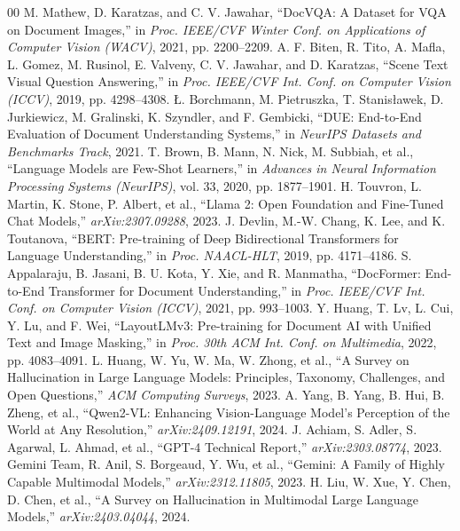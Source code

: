 \documentclass[conference]{IEEEtran}
\begin{document}
{%
\begin{thebibliography}{00}
 M. Mathew, D. Karatzas, and C. V. Jawahar, ``DocVQA: A Dataset for VQA on Document Images,'' in \emph{Proc. IEEE/CVF Winter Conf. on Applications of Computer Vision (WACV)}, 2021, pp. 2200--2209.
 A. F. Biten, R. Tito, A. Mafla, L. Gomez, M. Rusinol, E. Valveny, C. V. Jawahar, and D. Karatzas, ``Scene Text Visual Question Answering,'' in \emph{Proc. IEEE/CVF Int. Conf. on Computer Vision (ICCV)}, 2019, pp. 4298--4308.
 {\L}. Borchmann, M. Pietruszka, T. Stanis{\l}awek, D. Jurkiewicz, M. Gralinski, K. Szyndler, and F. Gembicki, ``DUE: End-to-End Evaluation of Document Understanding Systems,'' in \emph{NeurIPS Datasets and Benchmarks Track}, 2021.
 T. Brown, B. Mann, N. Nick, M. Subbiah, et al., ``Language Models are Few-Shot Learners,'' in \emph{Advances in Neural Information Processing Systems (NeurIPS)}, vol. 33, 2020, pp. 1877--1901.
 H. Touvron, L. Martin, K. Stone, P. Albert, et al., ``Llama 2: Open Foundation and Fine-Tuned Chat Models,'' \emph{arXiv:2307.09288}, 2023.
 J. Devlin, M.-W. Chang, K. Lee, and K. Toutanova, ``BERT: Pre-training of Deep Bidirectional Transformers for Language Understanding,'' in \emph{Proc. NAACL-HLT}, 2019, pp. 4171--4186.
 S. Appalaraju, B. Jasani, B. U. Kota, Y. Xie, and R. Manmatha, ``DocFormer: End-to-End Transformer for Document Understanding,'' in \emph{Proc. IEEE/CVF Int. Conf. on Computer Vision (ICCV)}, 2021, pp. 993--1003.
 Y. Huang, T. Lv, L. Cui, Y. Lu, and F. Wei, ``LayoutLMv3: Pre-training for Document AI with Unified Text and Image Masking,'' in \emph{Proc. 30th ACM Int. Conf. on Multimedia}, 2022, pp. 4083--4091.
 L. Huang, W. Yu, W. Ma, W. Zhong, et al., ``A Survey on Hallucination in Large Language Models: Principles, Taxonomy, Challenges, and Open Questions,'' \emph{ACM Computing Surveys}, 2023.
 A. Yang, B. Yang, B. Hui, B. Zheng, et al., ``Qwen2-VL: Enhancing Vision-Language Model's Perception of the World at Any Resolution,'' \emph{arXiv:2409.12191}, 2024.
 J. Achiam, S. Adler, S. Agarwal, L. Ahmad, et al., ``GPT-4 Technical Report,'' \emph{arXiv:2303.08774}, 2023.
 Gemini Team, R. Anil, S. Borgeaud, Y. Wu, et al., ``Gemini: A Family of Highly Capable Multimodal Models,'' \emph{arXiv:2312.11805}, 2023.
 H. Liu, W. Xue, Y. Chen, D. Chen, et al., ``A Survey on Hallucination in Multimodal Large Language Models,'' \emph{arXiv:2403.04044}, 2024.

\end{thebibliography}}
\end{document}
